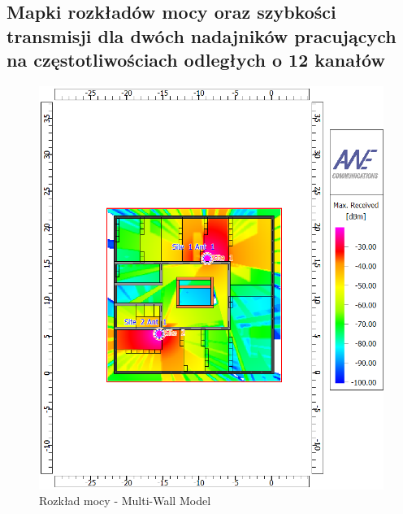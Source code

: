 \documentclass[12pt, a4paper, oneside]{article}
\begin{document}
\subsection{Mapki rozkładów mocy oraz szybkości transmisji dla dwóch nadajników pracujących na częstotliwościach odległych o 12 kanałów}
\begin{figure}[h]
\centering
\caption{Rozkład mocy - Multi-Wall Model}
\includegraphics[scale=0.63]{RECEIVED.png}
\end{figure}
\end{document}
